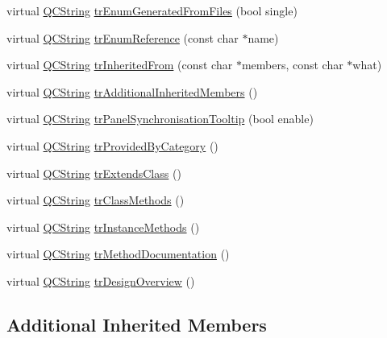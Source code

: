\begin{DoxyCompactItemize}
\item 
virtual \hyperlink{class_q_c_string}{Q\-C\-String} \hyperlink{class_translator_greek_a2039b9a9624800366462f980e8ebce70}{tr\-Enum\-Generated\-From\-Files} (bool single)
\item 
virtual \hyperlink{class_q_c_string}{Q\-C\-String} \hyperlink{class_translator_greek_a0209ef4cc7768fc9abf62f7ffc95534e}{tr\-Enum\-Reference} (const char $\ast$name)
\item 
virtual \hyperlink{class_q_c_string}{Q\-C\-String} \hyperlink{class_translator_greek_af8b8b1bb56a7ea74b11dad76e644968e}{tr\-Inherited\-From} (const char $\ast$members, const char $\ast$what)
\item 
virtual \hyperlink{class_q_c_string}{Q\-C\-String} \hyperlink{class_translator_greek_a62da1a83afa60109108fba6ad327a06f}{tr\-Additional\-Inherited\-Members} ()
\item 
virtual \hyperlink{class_q_c_string}{Q\-C\-String} \hyperlink{class_translator_greek_a1800c322fe577f6dfab2ab8eb463a78e}{tr\-Panel\-Synchronisation\-Tooltip} (bool enable)
\item 
virtual \hyperlink{class_q_c_string}{Q\-C\-String} \hyperlink{class_translator_greek_a48bb5cf8c4d20b9215921504ca43c8cf}{tr\-Provided\-By\-Category} ()
\item 
virtual \hyperlink{class_q_c_string}{Q\-C\-String} \hyperlink{class_translator_greek_a943bb1d0d3cf3c3ddca3616c21f815da}{tr\-Extends\-Class} ()
\item 
virtual \hyperlink{class_q_c_string}{Q\-C\-String} \hyperlink{class_translator_greek_a00e0dc60db9c989dad1bc310b4bdf08c}{tr\-Class\-Methods} ()
\item 
virtual \hyperlink{class_q_c_string}{Q\-C\-String} \hyperlink{class_translator_greek_ac194051c0538db0a70504f6d11fbf9b7}{tr\-Instance\-Methods} ()
\item 
virtual \hyperlink{class_q_c_string}{Q\-C\-String} \hyperlink{class_translator_greek_a4666cdb4ca29df1818744d88fc17e619}{tr\-Method\-Documentation} ()
\item 
virtual \hyperlink{class_q_c_string}{Q\-C\-String} \hyperlink{class_translator_greek_a5aeee72580ed889d0f0253be39800cc8}{tr\-Design\-Overview} ()
\end{DoxyCompactItemize}
\subsection*{Additional Inherited Members}


